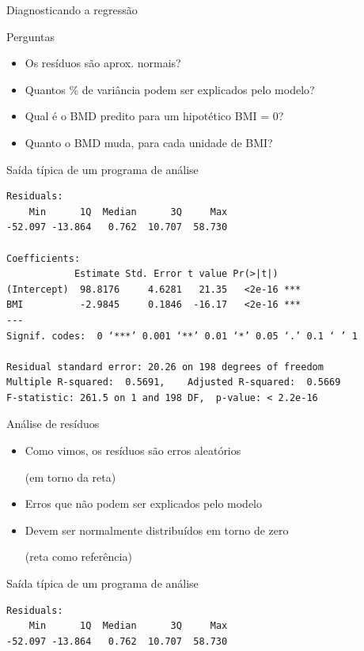 \documentclass{beamer}
\begin{document}
\begin{frame}[fragile]{Diagnosticando a regressão}
  \begin{block}{Perguntas}
    \begin{itemize}
      \footnotesize
    \item Os resíduos são aprox. normais?
    \item Quantos \% de variância podem ser explicados pelo modelo?
    \item Qual é o BMD predito para um hipotético BMI = 0?
    \item Quanto o BMD muda, para cada unidade de BMI?
    \end{itemize}
  \end{block}
  \begin{exampleblock}{Saída típica de um programa de análise}
    \tiny
\begin{verbatim}
Residuals:
    Min      1Q  Median      3Q     Max 
-52.097 -13.864   0.762  10.707  58.730 

Coefficients:
            Estimate Std. Error t value Pr(>|t|)    
(Intercept)  98.8176     4.6281   21.35   <2e-16 ***
BMI          -2.9845     0.1846  -16.17   <2e-16 ***
---
Signif. codes:  0 ‘***’ 0.001 ‘**’ 0.01 ‘*’ 0.05 ‘.’ 0.1 ‘ ’ 1

Residual standard error: 20.26 on 198 degrees of freedom
Multiple R-squared:  0.5691,	Adjusted R-squared:  0.5669 
F-statistic: 261.5 on 1 and 198 DF,  p-value: < 2.2e-16
\end{verbatim}
\end{exampleblock}
\end{frame}

\begin{frame}[fragile]{Análise de resíduos}
  \begin{itemize}
  \item Como vimos, os resíduos são erros aleatórios

    ({\footnotesize em torno da reta})
    \bigskip
  \item {\small Erros que não podem ser explicados pelo modelo}
    \bigskip

  \item Devem ser normalmente distribuídos em torno de zero

    ({\footnotesize reta como referência})
  \end{itemize}
  \vfill
  \begin{exampleblock}{Saída típica de um programa de análise}
    \footnotesize
\begin{verbatim}
Residuals:
    Min      1Q  Median      3Q     Max 
-52.097 -13.864   0.762  10.707  58.730 
\end{verbatim}
  \end{exampleblock}
\end{frame}
\end{document}
